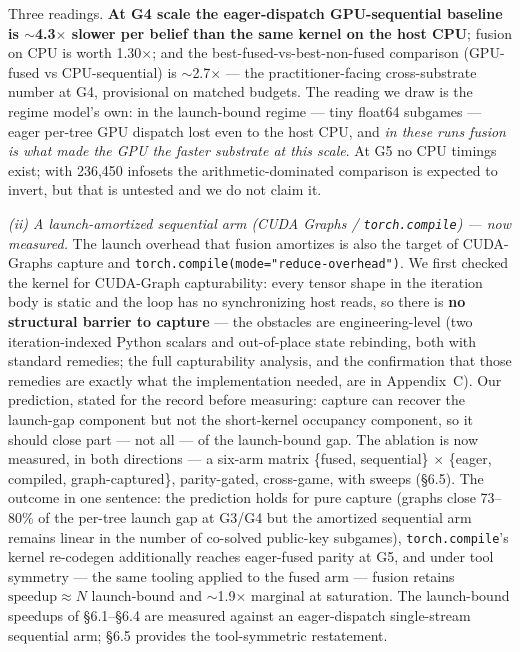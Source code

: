 \documentclass[11pt]{article}
\begin{document}
Three readings. \textbf{At G4 scale the eager-dispatch GPU-sequential baseline is
$\sim$4.3$\times$ slower per belief than the same kernel on the host CPU}; fusion on CPU
is worth 1.30$\times$; and the best-fused-vs-best-non-fused comparison (GPU-fused vs
CPU-sequential) is $\sim$2.7$\times$ --- the practitioner-facing cross-substrate number
at G4, provisional on matched budgets. The reading we draw is the regime model's own: in
the launch-bound regime --- tiny float64 subgames --- eager per-tree GPU dispatch lost
even to the host CPU, and \emph{in these runs fusion is what made the GPU the faster
substrate at this scale}. At G5 no CPU timings exist; with 236,450 infosets the
arithmetic-dominated comparison is expected to invert, but that is untested and we do
not claim it.

\emph{(ii) A launch-amortized sequential arm (CUDA Graphs / \texttt{torch.compile})
--- now measured.} The launch overhead that fusion amortizes is also the target of
CUDA-Graphs capture and \texttt{torch.compile(mode="reduce-overhead")}. We first
checked the kernel for CUDA-Graph capturability: every tensor shape in the iteration body
is static and the loop has no synchronizing host reads, so there is \textbf{no
structural barrier to capture} --- the obstacles are engineering-level (two
iteration-indexed Python scalars and out-of-place state rebinding, both with standard
remedies; the full capturability analysis, and the confirmation that those remedies are exactly what the
implementation needed, are in Appendix~C). Our prediction, stated for the record before
measuring: capture can recover the launch-gap component but not the short-kernel
occupancy component, so it should close part --- not all --- of the launch-bound gap.
The ablation is now measured, in both directions --- a six-arm matrix \{fused,
sequential\} $\times$ \{eager, compiled, graph-captured\}, parity-gated, cross-game,
with sweeps (\S6.5). The outcome in one sentence: the prediction holds for pure capture
(graphs close 73--80\% of the per-tree launch gap at G3/G4 but the amortized sequential
arm remains linear in the number of co-solved public-key subgames),
\texttt{torch.compile}'s kernel re-codegen
additionally reaches eager-fused parity at G5, and under tool symmetry --- the same
tooling applied to the fused arm --- fusion retains $\text{speedup} \approx N$
launch-bound and $\sim$1.9$\times$ marginal at saturation. The launch-bound speedups of
\S6.1--\S6.4 are measured against an eager-dispatch single-stream sequential arm;
\S6.5 provides the tool-symmetric restatement.
\end{document}
